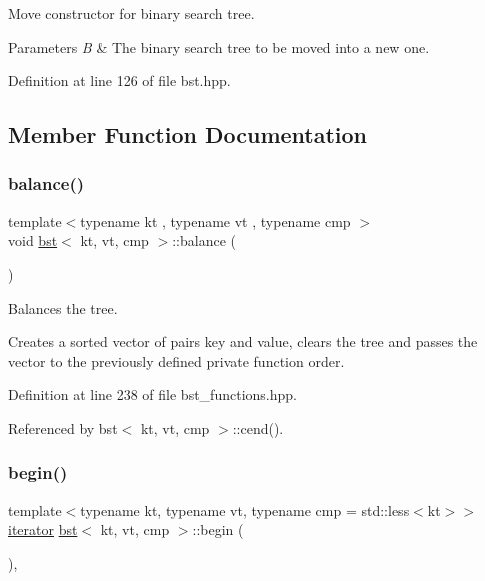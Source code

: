 Move constructor for binary search tree. 


\begin{DoxyParams}{Parameters}
{\em B} & The binary search tree to be moved into a new one. \\
\hline
\end{DoxyParams}


Definition at line 126 of file bst.\+hpp.



\subsection{Member Function Documentation}
\mbox{\label{classbst_a4ac74357616de45d5d3e7cbb9850854e}} 
\subsubsection{\texorpdfstring{balance()}{balance()}}
{\footnotesize\ttfamily template$<$typename kt , typename vt , typename cmp $>$ \\
void \hyperlink{classbst}{bst}$<$ kt, vt, cmp $>$\+::balance (\begin{DoxyParamCaption}{ }\end{DoxyParamCaption})\hspace{0.3cm}{\ttfamily [noexcept]}}



Balances the tree. 

Creates a sorted vector of pairs key and value, clears the tree and passes the vector to the previously defined private function order. 

Definition at line 238 of file bst\+\_\+functions.\+hpp.



Referenced by bst$<$ kt, vt, cmp $>$\+::cend().

\mbox{\label{classbst_a74c68495fd963c501084d129d4c0f5b1}} 
\subsubsection{\texorpdfstring{begin()}{begin()}\hspace{0.1cm}{\footnotesize\ttfamily [1/2]}}
{\footnotesize\ttfamily template$<$typename kt, typename vt, typename cmp = std\+::less$<$kt$>$$>$ \\
\hyperlink{classbst_a429b0445783ff6486882db5dee900ce0}{iterator} \hyperlink{classbst}{bst}$<$ kt, vt, cmp $>$\+::begin (\begin{DoxyParamCaption}{ }\end{DoxyParamCaption})\hspace{0.3cm}{\ttfamily [inline]}, {\ttfamily [noexcept]}}



